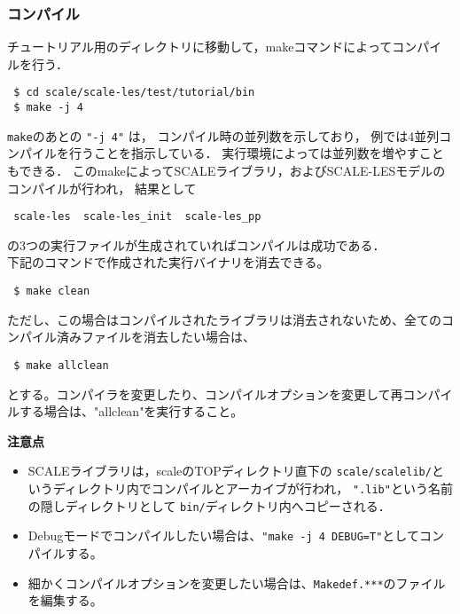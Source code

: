 \subsubsection{コンパイル}

チュートリアル用のディレクトリに移動して，makeコマンドによってコンパイルを行う．
\begin{verbatim}
 $ cd scale/scale-les/test/tutorial/bin
 $ make -j 4
\end{verbatim}
\verb|make|のあとの \verb|"-j 4"| は，
コンパイル時の並列数を示しており，
例では4並列コンパイルを行うことを指示している．
実行環境によっては並列数を増やすこともできる．
このmakeによってSCALEライブラリ，およびSCALE-LESモデルのコンパイルが行われ，
結果として
\begin{verbatim}
 scale-les  scale-les_init  scale-les_pp
\end{verbatim}
の3つの実行ファイルが生成されていればコンパイルは成功である．\\

下記のコマンドで作成された実行バイナリを消去できる。
\begin{verbatim}
 $ make clean
\end{verbatim}
ただし、この場合はコンパイルされたライブラリは消去されないため、全てのコンパイル済みファイルを消去したい場合は、
\begin{verbatim}
 $ make allclean
\end{verbatim}
とする。コンパイラを変更したり、コンパイルオプションを変更して再コンパイルする場合は、"allclean"を実行すること。


{\bf 注意点}
\begin{itemize}
\item SCALEライブラリは，scaleのTOPディレクトリ直下の
 \verb|scale/scalelib/|というディレクトリ内でコンパイルとアーカイブが行われ，
 \verb|".lib"|という名前の隠しディレクトリとして
 \verb|bin/|ディレクトリ内へコピーされる．
\item Debugモードでコンパイルしたい場合は、\verb|"make -j 4 DEBUG=T"|としてコンパイルする。
\item 細かくコンパイルオプションを変更したい場合は、\verb|Makedef.***|のファイルを編集する。
\end{itemize}


